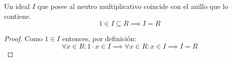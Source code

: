 \begin{thm}
    Un ideal $I$ que posee al neutro multiplicativo coincide con el anillo que lo contiene.
    \begin{equation}
        1 \in I \subseteq R \implies I = R
    \end{equation}
    \label{thm:ideal-neutro-multiplicativo}
\end{thm}

\begin{proof}
    Como $1 \in I$ entonces, por definición: 
    \begin{equation}
        \forall x \in R: 1 \cdot x \in I \implies \forall x \in R: x \in I \implies I = R
    \end{equation}
\end{proof}
